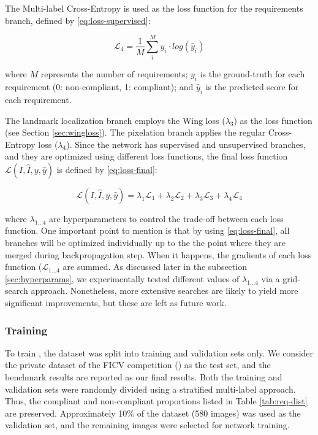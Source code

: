 The Multi-label Cross-Entropy is used as the loss function for the requirements branch, defined by \autoref{eq:loss-supervised}:
 
\begin{equation}
\label{eq:loss-supervised}
\mathcal{L}_4 = \frac{1}{M} \sum_i^M {y_i \cdot log(\hat{y}_i)}
\end{equation}
 
\noindent where $M$ represents the number of requirements; $y_i$ is the ground-truth for each requirement (0: non-compliant, 1: compliant); and $\hat{y}_i$ is the predicted score for each requirement.
 
The landmark localization branch employs the Wing loss ($\lambda_3$) as the loss function (see Section \ref{sec:wingloss}). The pixelation branch applies the regular Cross-Entropy loss ($\lambda_4$). Since the network has supervised and unsupervised branches, and they are optimized using different loss functions, the final loss function $\mathcal{L}(I, \hat{I}, y, \hat{y})$ is defined by \autoref{eq:loss-final}:
 
\begin{equation}
\label{eq:loss-final}
\mathcal{L}(I, \hat{I}, y, \hat{y}) = \lambda_1\mathcal{L}_1 + \lambda_2\mathcal{L}_2 + \lambda_3\mathcal{L}_3 + \lambda_4\mathcal{L}_4
\end{equation}
 
\noindent where $\lambda_{1...4}$ are hyperparameters to control the trade-off between each loss function. One important point to mention is that by using \autoref{eq:loss-final}, all branches will be optimized individually up to the the point where they are merged during backpropagation step. When it happens, the gradients of each loss function ($\mathcal{L}_{1...4}$ are summed. As discussed later in the subsection \ref{sec:hyperparams}, we experimentally tested different values of $\lambda_{1...4}$ via a grid-search approach. Nonetheless, more extensive searches are likely to yield more significant improvements, but these are left as future work.
 
\subsubsection{Training} 
 
To train \methodname, the \adhoc dataset was split into training and validation sets only. We consider the private dataset of the FICV competition (\ficvofficial) as the test set, and the benchmark results are reported as our final results. Both the training and validation sets were randomly divided using a stratified multi-label approach. Thus, the compliant and non-compliant proportions listed in Table \ref{tab:req-dist} are preserved. Approximately 10\% of the dataset (580 images) was used as the validation set, and the remaining images were selected for network training.
 

